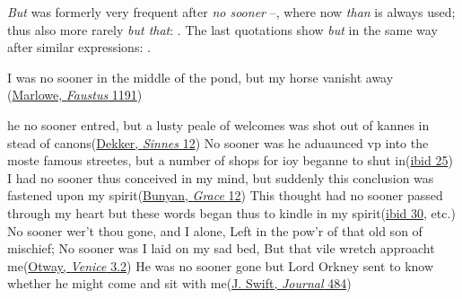 \textit{But} was formerly very frequent after \textit{no sooner} --, where now \textit{than} is always used; thus also more rarely \textit{but that}: . The last quotations show \textit{but} in the same way after similar expressions: .

\ea \label{ex:12-117}
I was no sooner in the middle of the pond, but my horse vanisht away\\\hfill(\href{https://babel.hathitrust.org/cgi/pt?id=uiuo.ark:/13960/t1pg73v3n&seq=208&q1=middle+of+the+pond}{Marlowe, \textit{Faustus} 1191})
\z

\ea \label{ex:12-118}
\ea
he no sooner entred, but a lusty peale of welcomes was shot out of kannes in stead of canons\hfill(\href{https://archive.org/details/nondramaticworks02dekkrich/page/18/mode/2up?q=%22he+no+fooner+entred%22&view=theater}{Dekker, \textit{Sinnes} 12}) %
\ex
No sooner was he aduaunced vp into the moste famous streetes, but a number of shops for ioy beganne to shut in\hfill(\href{https://archive.org/details/nondramaticworks02dekkrich/page/40/mode/2up?q=%22no+fooner+was+he+aduaunced%22&view=theater}{ibid 25}) %
\ex
I had no sooner thus conceived in my mind, but suddenly this conclusion was fastened upon my spirit\hfill(\href{https://archive.org/details/graceaboundingto00buny/page/16/mode/2up?q=%22no+sooner%22&view=theater}{Bunyan, \textit{Grace} 12}) %
\ex
This thought had no sooner passed through my heart but these words began thus to kindle in my spirit\hfill(\href{https://archive.org/details/graceaboundingto00buny/page/46/mode/2up?q=%22no+sooner%22&view=theater}{ibid 30}, etc.) %
\ex
No sooner wer't thou gone, and I alone, Left in the pow'r of that old son of mischief; No sooner was I laid on my sad bed, But that vile wretch approacht me\hfill(\href{https://archive.org/details/venicepreservdor00otwa/page/32/mode/2up?q=%22was+I+lain+on+my%22&view=theater}{Otway, \textit{Venice} 3.2}) %
\ex
He was no sooner gone but Lord Orkney sent to know whether he might come and sit with me\hfill(\href{https://archive.org/details/journaltostellae00swifuoft/page/484/mode/2up?q=%22no+sooner+gone+but%22&view=theater}{J. Swift, \textit{Journal} 484}) %
\z \z

